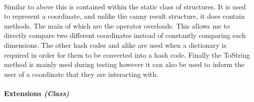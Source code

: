 \begin{FlushLeft}
    \begin{figure}[H]
        \centering
    \end{figure}\\

    Similar to above this is contained within the static class of structures. It is used to represent a coordinate, and unlike the canny result structure, it does contain methods. The main of which are the operator overloads. This allows me to directly compare two different coordinates instead of constantly comparing each dimensions. The other hash codes and alike are used when a dictionary is required in order for them to be converted into a hash code. Finally the ToString method is mainly used during testing however it can also be used to inform the user of a coordinate that they are interacting with.

    \bk

    \paragraph*{Extensions \textit{(Class)}} \mbox{} \\

    \begin{figure}[H]
        \centering
    \end{figure}\\


\end{FlushLeft}
